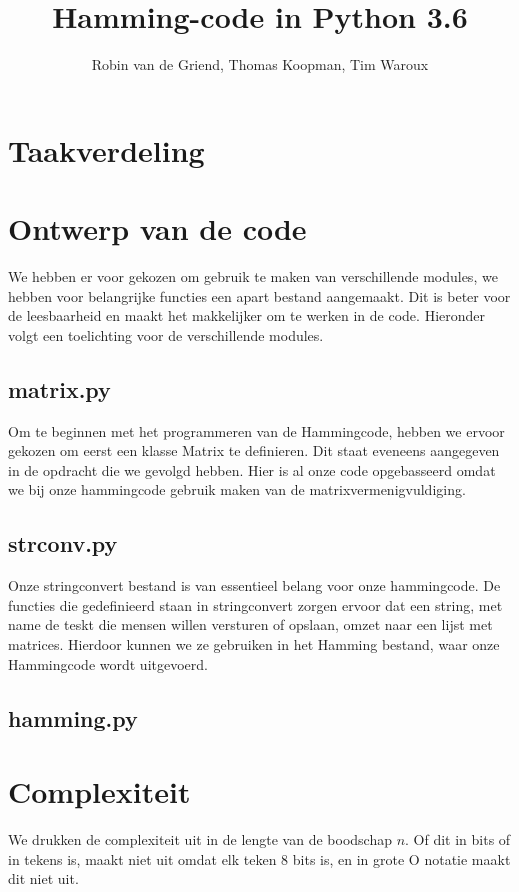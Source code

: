 \documentclass[a4paper]{article}
\begin{document}
\title{Hamming-code in Python 3.6}
\author{Robin van de Griend, Thomas Koopman, Tim Waroux}
\maketitle

\section{Taakverdeling}

\section{Ontwerp van de code}
We hebben er voor gekozen om gebruik te maken van verschillende modules, we hebben voor belangrijke functies een apart bestand aangemaakt. Dit is beter voor de leesbaarheid en maakt het makkelijker om te werken in de code. Hieronder volgt een toelichting voor de verschillende modules.

\subsection{matrix.py}
	Om te beginnen met het programmeren van de Hammingcode, hebben we ervoor gekozen om eerst een klasse Matrix te definieren. Dit staat eveneens aangegeven in de opdracht die we gevolgd hebben. Hier is al onze code opgebasseerd omdat we bij onze hammingcode gebruik maken van de matrixvermenigvuldiging.

\subsection{strconv.py}
	Onze stringconvert bestand is van essentieel belang voor onze hammingcode. De functies die gedefinieerd staan in stringconvert zorgen ervoor dat een string, met name de teskt die mensen willen versturen of opslaan, omzet naar een lijst met matrices. Hierdoor kunnen we ze gebruiken in het Hamming bestand, waar onze Hammingcode wordt uitgevoerd.

\subsection{hamming.py}
	
\section{Complexiteit}
We drukken de complexiteit uit in de lengte van de boodschap \(n\). Of dit in bits of in tekens is, maakt niet uit omdat elk teken 8 bits is, en in grote O notatie maakt dit niet uit.
\end{document}
